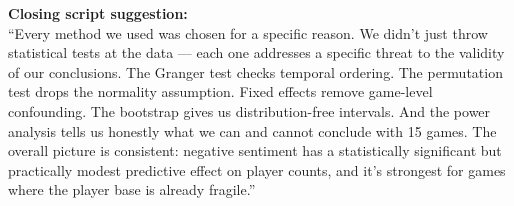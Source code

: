 \documentclass[11pt, letterpaper]{article}
\theoremstyle{definition}
\begin{document}
\vspace{1em}
\begin{speakerbox}
\textbf{Closing script suggestion:}\\
``Every method we used was chosen for a specific reason.
We didn't just throw statistical tests at the data --- each one addresses a specific threat to the validity of our conclusions.
The Granger test checks temporal ordering.
The permutation test drops the normality assumption.
Fixed effects remove game-level confounding.
The bootstrap gives us distribution-free intervals.
And the power analysis tells us honestly what we can and cannot conclude with 15 games.
The overall picture is consistent: negative sentiment has a statistically significant but practically modest predictive effect on player counts, and it's strongest for games where the player base is already fragile.''
\end{speakerbox}
\end{document}

